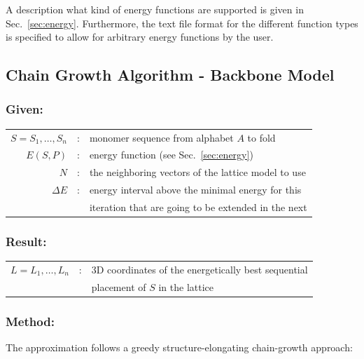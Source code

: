 \documentclass{article}
\begin{document}
A description what kind of energy functions are supported is given in
Sec.~\ref{sec:energy}. Furthermore, the text file format for the different
function types is specified to allow for arbitrary energy functions by the user.

\subsection{Chain Growth Algorithm - Backbone Model}
\label{sec:ext}

\subsubsection*{Given:}

\begin{tabular}{rcl}
	$S=S_1,\ldots,S_n$ &:& monomer sequence from alphabet $A$ to fold \\
	$E(S,P)$ &:& energy function (see Sec.~\ref{sec:energy})\\
	$N$ &:& the neighboring vectors of the lattice model to use \\
	$\Delta E$	&:& energy interval above the minimal energy for this \\
				&& iteration that are going to be extended in the next
\end{tabular}

\subsubsection*{Result:}

\begin{tabular}{rcl}
	$L=L_1,\ldots,L_n$	&:& 3D coordinates of the energetically best sequential \\
						&& placement of $S$ in the lattice
\end{tabular}

\subsubsection*{Method:}

The approximation follows a greedy structure-elongating chain-growth approach:
\end{document}
